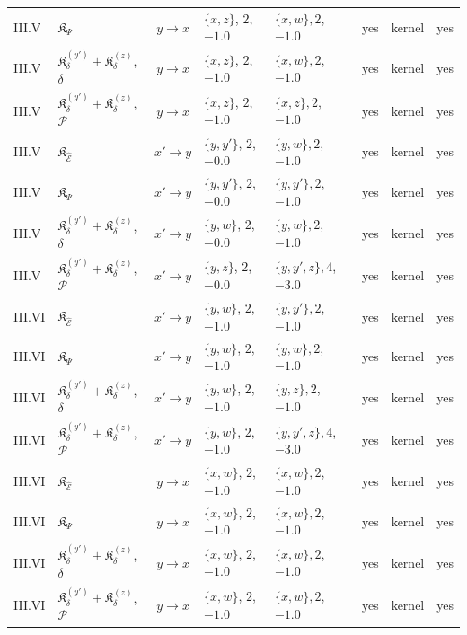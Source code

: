 {\begin{center}
\begin{tabular}{|l|l|c|l|l|c|l|c|}
III.V & $\mathfrak K_\Psi$ & $y\to x$ & $\{x,z\}$, $2$, $-1.0$ & $\{x,w\}, 2$, $-1.0$ & yes & kernel & yes\\
III.V & $\mathfrak K_\delta^{(y')}{+}\mathfrak K_\delta^{(z)}$, $\delta$ & $y\to x$ & $\{x,z\}$, $2$, $-1.0$ & $\{x,w\}, 2$, $-1.0$ & yes & kernel & yes\\
III.V & $\mathfrak K_\delta^{(y')}{+}\mathfrak K_\delta^{(z)}$, $\mathcal P$ & $y\to x$ & $\{x,z\}$, $2$, $-1.0$ & $\{x,z\}, 2$, $-1.0$ & yes & kernel & yes\\
III.V & $\mathfrak K_{\widehat{\mathcal E}}$ & $x'\to y$ & $\{y,y'\}$, $2$, $-0.0$ & $\{y,w\}, 2$, $-1.0$ & yes & kernel & yes\\
III.V & $\mathfrak K_\Psi$ & $x'\to y$ & $\{y,y'\}$, $2$, $-0.0$ & $\{y,y'\}, 2$, $-1.0$ & yes & kernel & yes\\
III.V & $\mathfrak K_\delta^{(y')}{+}\mathfrak K_\delta^{(z)}$, $\delta$ & $x'\to y$ & $\{y,w\}$, $2$, $-0.0$ & $\{y,w\}, 2$, $-1.0$ & yes & kernel & yes\\
III.V & $\mathfrak K_\delta^{(y')}{+}\mathfrak K_\delta^{(z)}$, $\mathcal P$ & $x'\to y$ & $\{y,z\}$, $2$, $-0.0$ & $\{y,y',z\}, 4$, $-3.0$ & yes & kernel & yes\\
III.VI & $\mathfrak K_{\widehat{\mathcal E}}$ & $x'\to y$ & $\{y,w\}$, $2$, $-1.0$ & $\{y,y'\}, 2$, $-1.0$ & yes & kernel & yes\\
III.VI & $\mathfrak K_\Psi$ & $x'\to y$ & $\{y,w\}$, $2$, $-1.0$ & $\{y,w\}, 2$, $-1.0$ & yes & kernel & yes\\
III.VI & $\mathfrak K_\delta^{(y')}{+}\mathfrak K_\delta^{(z)}$, $\delta$ & $x'\to y$ & $\{y,w\}$, $2$, $-1.0$ & $\{y,z\}, 2$, $-1.0$ & yes & kernel & yes\\
III.VI & $\mathfrak K_\delta^{(y')}{+}\mathfrak K_\delta^{(z)}$, $\mathcal P$ & $x'\to y$ & $\{y,w\}$, $2$, $-1.0$ & $\{y,y',z\}, 4$, $-3.0$ & yes & kernel & yes\\
III.VI & $\mathfrak K_{\widehat{\mathcal E}}$ & $y\to x$ & $\{x,w\}$, $2$, $-1.0$ & $\{x,w\}, 2$, $-1.0$ & yes & kernel & yes\\
III.VI & $\mathfrak K_\Psi$ & $y\to x$ & $\{x,w\}$, $2$, $-1.0$ & $\{x,w\}, 2$, $-1.0$ & yes & kernel & yes\\
III.VI & $\mathfrak K_\delta^{(y')}{+}\mathfrak K_\delta^{(z)}$, $\delta$ & $y\to x$ & $\{x,w\}$, $2$, $-1.0$ & $\{x,w\}, 2$, $-1.0$ & yes & kernel & yes\\
III.VI & $\mathfrak K_\delta^{(y')}{+}\mathfrak K_\delta^{(z)}$, $\mathcal P$ & $y\to x$ & $\{x,w\}$, $2$, $-1.0$ & $\{x,w\}, 2$, $-1.0$ & yes & kernel & yes\\

\end{tabular}
\end{center}}

